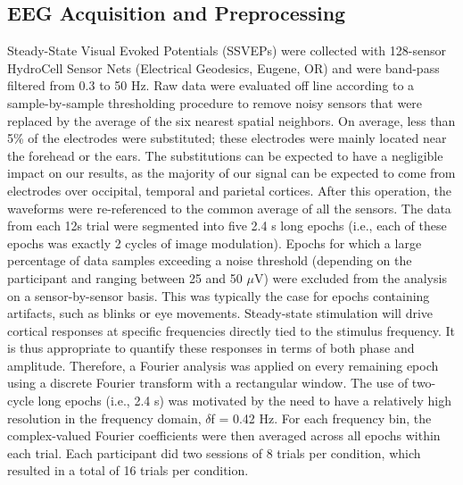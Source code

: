 \documentclass[9pt,twocolumn,twoside,lineno]{pnas-new}
\begin{document}
\subsection*{EEG Acquisition and Preprocessing}
Steady-State Visual Evoked Potentials (SSVEPs) were collected with 128-sensor HydroCell Sensor Nets (Electrical Geodesics, Eugene, OR) and were band-pass filtered from 0.3 to 50 Hz. Raw data were evaluated off line according to a sample-by-sample thresholding procedure to remove noisy sensors that were replaced by the average of the six nearest spatial neighbors. On average, less than 5\% of the electrodes were substituted; these electrodes were mainly located near the forehead or the ears. The substitutions can be expected to have a negligible impact on our results, as the majority of our signal can be expected to come from electrodes over occipital, temporal and parietal cortices. After this operation, the waveforms were re-referenced to the common average of all the sensors. The data from each 12s trial were segmented into five 2.4 s long epochs (i.e., each of these epochs was exactly 2 cycles of image modulation). Epochs for which a large percentage of data samples exceeding a noise threshold (depending on the participant and ranging between 25 and 50 $\mu$V) were excluded from the analysis on a sensor-by-sensor basis. This was typically the case for epochs containing artifacts, such as blinks or eye movements. Steady-state stimulation will drive cortical responses at specific frequencies directly tied to the stimulus frequency. It is thus appropriate to quantify these responses in terms of both phase and amplitude. Therefore, a Fourier analysis was applied on every remaining epoch using a discrete Fourier transform with a rectangular window. The use of two-cycle long epochs (i.e., 2.4 s) was motivated by the need to have a relatively high resolution in the frequency domain, $\delta$f = 0.42 Hz. For each frequency bin, the complex-valued Fourier coefficients were then averaged across all epochs within each trial. Each participant did two sessions of 8 trials per condition, which resulted in a total of 16 trials per condition.
\end{document}
